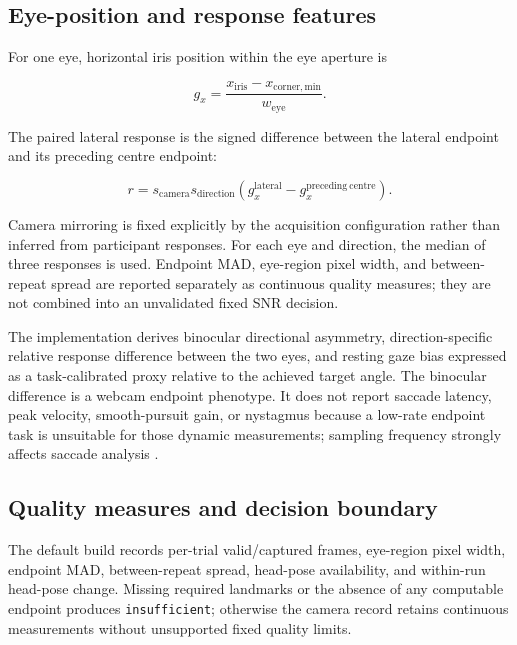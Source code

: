 \documentclass[11pt,a4paper]{article}
\begin{document}
\subsection{Eye-position and response features}

For one eye, horizontal iris position within the eye aperture is

\begin{equation}
g_x=\frac{x_{\mathrm{iris}}-x_{\mathrm{corner,min}}}{w_{\mathrm{eye}}}.
\end{equation}

The paired lateral response is the signed difference between the lateral endpoint and its preceding centre endpoint:

\begin{equation}
r=s_{\mathrm{camera}}s_{\mathrm{direction}}
\left(g_x^{\mathrm{lateral}}-g_x^{\mathrm{preceding\ centre}}\right).
\end{equation}

Camera mirroring is fixed explicitly by the acquisition configuration rather than inferred from participant responses. For each eye and direction, the median of three responses is used. Endpoint MAD, eye-region pixel width, and between-repeat spread are reported separately as continuous quality measures; they are not combined into an unvalidated fixed SNR decision.

The implementation derives binocular directional asymmetry, direction-specific relative response difference between the two eyes, and resting gaze bias expressed as a task-calibrated proxy relative to the achieved target angle. The binocular difference is a webcam endpoint phenotype. It does not report saccade latency, peak velocity, smooth-pursuit gain, or nystagmus because a low-rate endpoint task is unsuitable for those dynamic measurements; sampling frequency strongly affects saccade analysis \cite{bahill1975mainsequence}.

\subsection{Quality measures and decision boundary}

The default build records per-trial valid/captured frames, eye-region pixel width, endpoint MAD, between-repeat spread, head-pose availability, and within-run head-pose change. Missing required landmarks or the absence of any computable endpoint produces \texttt{insufficient}; otherwise the camera record retains continuous measurements without unsupported fixed quality limits.
\end{document}

